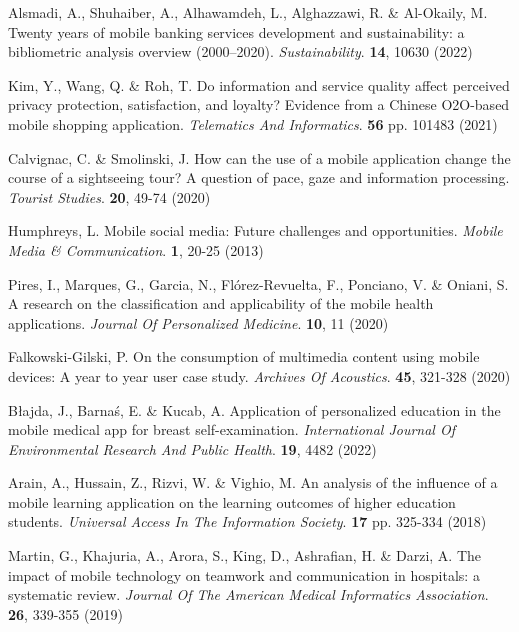 \documentclass[preprint,12pt,number]{elsarticle}
\begin{document}
\begin{thebibliography}{00}
Alsmadi, A., Shuhaiber, A., Alhawamdeh, L., Alghazzawi, R. \& Al-Okaily, M. Twenty years of mobile banking services development and sustainability: a bibliometric analysis overview (2000–2020). {\em Sustainability}. \textbf{14}, 10630 (2022)

Kim, Y., Wang, Q. \& Roh, T. Do information and service quality affect perceived privacy protection, satisfaction, and loyalty? Evidence from a Chinese O2O-based mobile shopping application. {\em Telematics And Informatics}. \textbf{56} pp. 101483 (2021)

Calvignac, C. \& Smolinski, J. How can the use of a mobile application change the course of a sightseeing tour? A question of pace, gaze and information processing. {\em Tourist Studies}. \textbf{20}, 49-74 (2020)

Humphreys, L. Mobile social media: Future challenges and opportunities. {\em Mobile Media \& Communication}. \textbf{1}, 20-25 (2013)

Pires, I., Marques, G., Garcia, N., Flórez-Revuelta, F., Ponciano, V. \& Oniani, S. A research on the classification and applicability of the mobile health applications. {\em Journal Of Personalized Medicine}. \textbf{10}, 11 (2020)

Falkowski-Gilski, P. On the consumption of multimedia content using mobile devices: A year to year user case study. {\em Archives Of Acoustics}. \textbf{45}, 321-328 (2020)

Błajda, J., Barnaś, E. \& Kucab, A. Application of personalized education in the mobile medical app for breast self-examination. {\em International Journal Of Environmental Research And Public Health}. \textbf{19}, 4482 (2022)

Arain, A., Hussain, Z., Rizvi, W. \& Vighio, M. An analysis of the influence of a mobile learning application on the learning outcomes of higher education students. {\em Universal Access In The Information Society}. \textbf{17} pp. 325-334 (2018)

Martin, G., Khajuria, A., Arora, S., King, D., Ashrafian, H. \& Darzi, A. The impact of mobile technology on teamwork and communication in hospitals: a systematic review. {\em Journal Of The American Medical Informatics Association}. \textbf{26}, 339-355 (2019)


\end{thebibliography}
\end{document}
